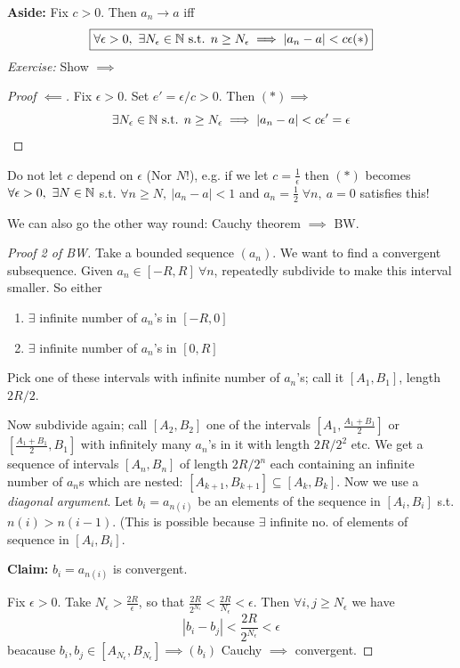 \documentclass[10pt,twoside]{scrartcl}
\begin{document}
\textbf{Aside:} Fix $c >0$. Then $a_n \to a$ iff 
\[\boxed{\forall \epsilon >0,~\exists N_{\epsilon} \in\mathbb{N} \text{ s.t. } n \geq N_\epsilon \implies |a_n - a| < c\epsilon (*)}\]
\emph{Exercise:} Show $\implies$

\begin{proof}[Proof $\impliedby$] Fix $\epsilon >0$. Set $e' = \epsilon/c >0$. Then $(*) \implies $
\[\exists N_\epsilon \in\mathbb{N} \text{ s.t. } n \geq N_\epsilon \implies |a_n - a| < c\epsilon' = \epsilon\qedhere\]
\end{proof}

\begin{warning} Do not let $c$ depend on $\epsilon$ (Nor $N!$), e.g. if we let $c = \frac{1}{\epsilon}$ then $(*)$ becomes $\forall \epsilon >0,~\exists N \in\mathbb{N}$ s.t. $\forall n \geq N,~|a_n - a| < 1$ and $a_n = \frac{1}{2}\; \forall n,~ a = 0$ satisfies this!	
\end{warning}

We can also go the other way round: Cauchy theorem $\implies$ BW. 

\begin{proof}[Proof 2 of BW]



Take a bounded sequence $(a_n)$. We want to find a convergent subsequence. Given $a_n \in [-R,R]~ \forall n$, repeatedly subdivide to make this interval smaller. So either
\begin{enumerate}
\item $\exists$ infinite number of $a_n$'s in $[-R,0]$
\item $\exists$ infinite number of $a_n$'s in $[0,R]$
\end{enumerate}

Pick one of these intervals with infinite number of $a_n$'s; call it $[A_1,B_1]$, length $2R/2$. 

Now subdivide again; call $[A_2,B_2]$ one of the intervals $[A_1,\frac{A_1+B_1}{2}]$ or $[\frac{A_1+B_1}{2},B_1]$ with infinitely many $a_n$'s in it with length $2R/2^2$ etc. We get a sequence of intervals $[A_n,B_n]$ of length $2R/2^n$ each containing an infinite number of $a_n$s which are nested: $[A_{k+1},B_{k+1}] \subseteq [A_k,B_k]$. Now we use a \emph{diagonal argument}. Let $b_i = a_{n(i)}$ be an elements of the sequence in $[A_i,B_i]$ s.t. $n(i) > n(i-1)$. (This is possible because $\exists$ infinite no. of elements of sequence in $[A_i,B_i]$. 

 \textbf{Claim:} $b_i = a_{n(i)}$ is convergent.

Fix $\epsilon >0$. Take $N_{\epsilon} > \frac{2R}{\epsilon}$, so that $\frac{2R}{2^{N_{\epsilon}}} < \frac{2R}{N_{\epsilon}} < \epsilon$. Then $\forall i, j \geq N_{\epsilon}$ we have
\[|b_i - b_j| < \frac{2R}{2^{N_{\epsilon}}} < \epsilon\]
beacause $b_i,b_j \in [A_{N_{\epsilon}},B_{N_{\epsilon}}] \implies (b_i)$ Cauchy $\implies$ convergent.
	\end{proof}\vspace*{5pt}
	
\end{document}
